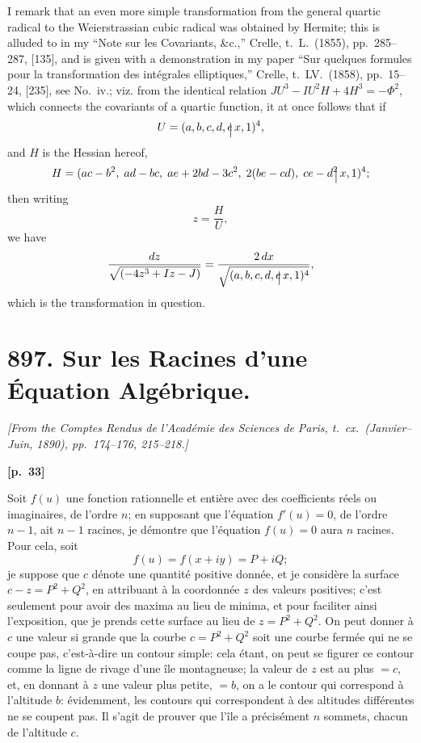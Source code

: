 \documentclass[11pt,a4paper]{article}
\theoremstyle{plain}
\begin{document}
I remark that an even more simple transformation from the general quartic radical to the Weierstrassian cubic radical was obtained by Hermite; this is alluded to in my ``Note sur les Covariants, \&c.,'' Crelle, t.\ L.\ (1855), pp.\ 285--287, [135], and is given with a demonstration in my paper ``Sur quelques formules pour la transformation des int\'egrales elliptiques,'' Crelle, t.\ LV.\ (1858), pp.\ 15--24, [235], see No.\ iv.; viz. from the identical relation $JU^3 - IU^2H + 4H^3 = -\Phi^2$, which connects the covariants of a quartic function, it at once follows that if
$$
U = (a, b, c, d, e \!\!\raisebox{-2pt}{$\bigm|$}\, x, 1)^4,
$$
and $H$ is the Hessian hereof,
$$
H = (ac - b^2,\; ad - bc,\; ae + 2bd - 3c^2,\; 2(be - cd),\; ce - d^2 \!\!\raisebox{-2pt}{$\bigm|$}\, x, 1)^4;
$$
then writing
$$
z = \frac{H}{U},
$$
we have
$$
\frac{dz}{\sqrt{(-4z^3 + Iz - J)}} = \frac{2\,dx}{\sqrt{(a, b, c, d, e \!\!\raisebox{-2pt}{$\bigm|$}\, x, 1)^4}},
$$
which is the transformation in question.

\newpage

\section*{897. Sur les Racines d'une \'Equation Alg\'ebrique.}

\noindent\textit{[From the Comptes Rendus de l'Acad\'emie des Sciences de Paris, t.\ cx.\ (Janvier--Juin, 1890), pp.\ 174--176, 215--218.]}

\vspace{0.5em}
\noindent\textbf{[p.\ 33]}

Soit $f(u)$ une fonction rationnelle et enti\`ere avec des coefficients r\'eels ou imaginaires, de l'ordre $n$; en supposant que l'\'equation $f'(u) = 0$, de l'ordre $n - 1$, ait $n - 1$ racines, je d\'emontre que l'\'equation $f(u) = 0$ aura $n$ racines. Pour cela, soit
$$
f(u) = f(x + iy) = P + iQ;
$$
je suppose que $c$ d\'enote une quantit\'e positive donn\'ee, et je consid\`ere la surface $c - z = P^2 + Q^2$, en attribuant \`a la coordonn\'ee $z$ des valeurs positives; c'est seulement pour avoir des maxima au lieu de minima, et pour faciliter ainsi l'exposition, que je prends cette surface au lieu de $z = P^2 + Q^2$. On peut donner \`a $c$ une valeur si grande que la courbe $c = P^2 + Q^2$ soit une courbe ferm\'ee qui ne se coupe pas, c'est-\`a-dire un contour simple: cela \'etant, on peut se figurer ce contour comme la ligne de rivage d'une \^ile montagneuse; la valeur de $z$ est au plus $= c$, et, en donnant \`a $z$ une valeur plus petite, $= b$, on a le contour qui correspond \`a l'altitude $b$: \'evidemment, les contours qui correspondent \`a des altitudes diff\'erentes ne se coupent pas. Il s'agit de prouver que l'\^ile a pr\'ecis\'ement $n$ sommets, chacun de l'altitude $c$.
\end{document}
